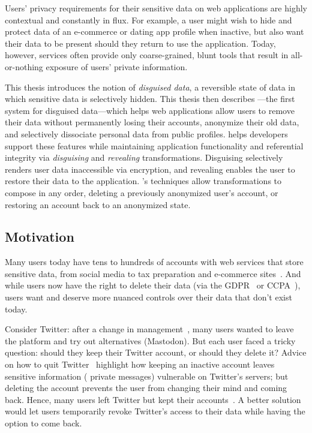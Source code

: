 Users' privacy requirements for their sensitive data on web applications are
highly contextual and constantly in flux. For example, a user might wish to hide
and protect data of an e-commerce or dating app profile when inactive, but also
want their data to be present should they return to use the application. 
%
Today, however, services often provide only coarse-grained, blunt tools that
result in all-or-nothing exposure of users’ private information.
%

%
This thesis introduces the notion of \emph{disguised data}, a reversible state
of data in which sensitive data is selectively hidden.
%
This thesis then describes \sys---the first system for disguised data---which
helps web applications allow users to remove their data without permanently
losing their accounts, anonymize their old data, and selectively dissociate
personal data from public profiles.
%
\sys helps developers support these features while maintaining application
functionality and referential integrity via \emph{disguising} and \emph{revealing}
transformations.
%
Disguising selectively renders user data inaccessible via encryption, and
revealing enables the user to restore their data to the application.
%
\sys's techniques allow transformations to compose in any order, \eg deleting a
previously anonymized user's account, or restoring an account back to an
anonymized state.
%

\subsection{Motivation} 
Many users today have tens to hundreds of accounts with web
services that store sensitive data, from social media to tax preparation and
e-commerce sites~\cite{tens,hundreds,password_life_cycle}.
%
And while users now have the right to delete their data (via \eg the
GDPR~\cite{eu:gdpr} or CCPA~\cite{ccpa}), users want and deserve more nuanced
controls over their data that don't exist today.
%

Consider Twitter: after a change in management~\cite{musk-twitter}, many users
wanted to leave the platform and try out alternatives (\eg Mastodon).  But each
user faced a tricky question: should they keep their Twitter account, or should
they delete it?
%
Advice on how to quit Twitter~\cite{quit-twitter-india, quit-twitter-mash}
highlight how keeping an inactive account leaves sensitive information (\eg
private messages) vulnerable on Twitter's servers; but deleting the account
prevents the user from changing their mind and coming back.  Hence, many users
left Twitter but kept their accounts~\cite{nbc-twitter,shondarhimes,kenolin}.
%
A better solution would let users temporarily revoke Twitter's access to their
data while having the option to come back.


